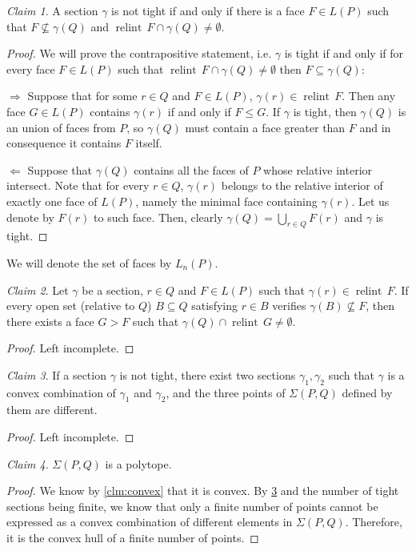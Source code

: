 \documentclass[10pt,a4paper]{article}
\DeclareMathOperator{\relint}{relint}
\theoremstyle{plain}
\theoremstyle{remark}
\newtheorem{claim}{Claim}
\theoremstyle{definition}
\begin{document}
\begin{claim} A section $\gamma$ is not tight if and only if there is a face $F\in L(P)$ such that $F\nsubseteq \gamma(Q)$ and $\relint \, F \cap \gamma(Q)\neq \emptyset$.
\end{claim}
\begin{proof} 
	We will prove the contrapositive statement, i.e.
	$\gamma$ is tight if and only if for every face $F\in L(P)$ such that 
	$\relint \, F \cap \gamma(Q)\neq \emptyset$ 
	then $F\subseteq \gamma(Q)$: \par
	$\boxed{\Rightarrow}$ 
	Suppose that for some $r\in Q$ and $F\in L(P)$, 
	$\gamma(r) \in \relint \,F$.
	Then any face $G\in L(P)$ contains $\gamma(r)$ if and only if $F\leq G$. 
	If $\gamma$ is tight, then $\gamma(Q)$ is an union of faces from $P$, 
	so $\gamma(Q)$ must contain a face greater than $F$ 
	and in consequence it contains $F$ itself. \par
	$\boxed{\Leftarrow}$ 
	Suppose that $\gamma(Q)$ contains all the faces of $P$ whose relative interior intersect. 
	Note that for every $r\in Q$, 
	$\gamma(r)$ belongs to the relative interior of exactly one face of $L(P)$, 
	namely the minimal face containing $\gamma(r)$.
	Let us denote by $F(r)$ to such face. 
	Then, clearly $\gamma(Q)=\bigcup_{r\in Q} F(r)$ and $\gamma$ is tight. 
\end{proof}

We will denote the set of faces by $L_n(P)$. 

\begin{claim} Let $\gamma$ be a section, $r\in Q$ and $F\in L(P)$ such that $\gamma(r) \in  \relint\, F$. If every open set (relative to $Q$) $B\subseteq Q$ satisfying $r\in B$ verifies $\gamma(B)\nsubseteq F$, then there exists a face $G > F$ such that $\gamma(Q)\cap \relint\, G \neq \emptyset$.
\end{claim}
\begin{proof} 
	Left incomplete.
\end{proof}

\begin{claim}\label{cl:convexCombSections}
	If a section $\gamma$ is not tight, there exist two sections
	$\gamma_1,\gamma_2$ such that $\gamma$ is a convex combination of 
	$\gamma_1$ and $\gamma_2$, 
	and the three points of $\Sigma(P,Q)$
	defined by them are different. 
\end{claim}
\begin{proof}
	Left incomplete.
\end{proof}
\begin{claim}
	$\Sigma(P,Q)$ is a polytope.
\end{claim}
\begin{proof}
	We know by \cref{clm:convex} that it is convex.
	By \cref{cl:convexCombSections} and the number of tight sections being finite,
	we know that only a finite number of points cannot be expressed as a convex 
	combination of different elements in $\Sigma(P,Q)$.
	Therefore, it is the convex hull of a finite number of points.
\end{proof}
\end{document}
